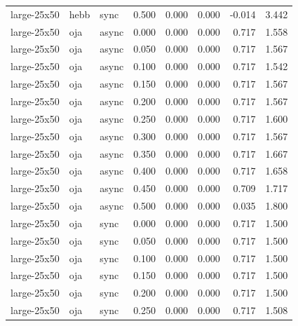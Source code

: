 \begin{tabular}{lllrrrrr}
large-25x50 & hebb & sync & 0.500 & 0.000 & 0.000 & -0.014 & 3.442 \\

large-25x50 & oja & async & 0.000 & 0.000 & 0.000 & 0.717 & 1.558 \\

large-25x50 & oja & async & 0.050 & 0.000 & 0.000 & 0.717 & 1.567 \\

large-25x50 & oja & async & 0.100 & 0.000 & 0.000 & 0.717 & 1.542 \\

large-25x50 & oja & async & 0.150 & 0.000 & 0.000 & 0.717 & 1.567 \\

large-25x50 & oja & async & 0.200 & 0.000 & 0.000 & 0.717 & 1.567 \\

large-25x50 & oja & async & 0.250 & 0.000 & 0.000 & 0.717 & 1.600 \\

large-25x50 & oja & async & 0.300 & 0.000 & 0.000 & 0.717 & 1.567 \\

large-25x50 & oja & async & 0.350 & 0.000 & 0.000 & 0.717 & 1.667 \\

large-25x50 & oja & async & 0.400 & 0.000 & 0.000 & 0.717 & 1.658 \\

large-25x50 & oja & async & 0.450 & 0.000 & 0.000 & 0.709 & 1.717 \\

large-25x50 & oja & async & 0.500 & 0.000 & 0.000 & 0.035 & 1.800 \\

large-25x50 & oja & sync & 0.000 & 0.000 & 0.000 & 0.717 & 1.500 \\

large-25x50 & oja & sync & 0.050 & 0.000 & 0.000 & 0.717 & 1.500 \\

large-25x50 & oja & sync & 0.100 & 0.000 & 0.000 & 0.717 & 1.500 \\

large-25x50 & oja & sync & 0.150 & 0.000 & 0.000 & 0.717 & 1.500 \\

large-25x50 & oja & sync & 0.200 & 0.000 & 0.000 & 0.717 & 1.500 \\

large-25x50 & oja & sync & 0.250 & 0.000 & 0.000 & 0.717 & 1.508 \\


\end{tabular}
